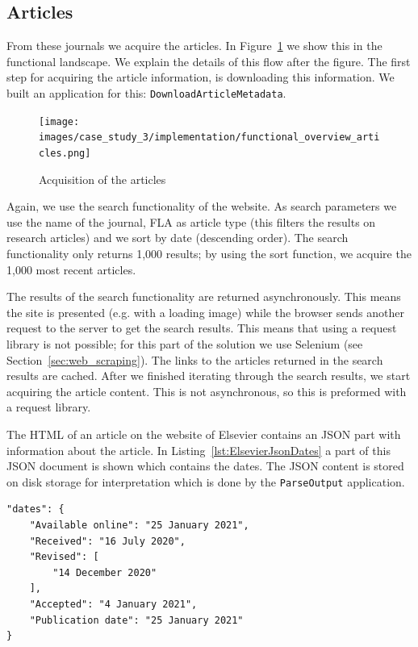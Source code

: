 \documentclass{ou-report}
\begin{document}
\subsection{Articles}
From these journals we acquire the articles. In
Figure~\ref{fig:functional_overview_elsevier_articles} we show this in the functional
landscape. We explain the details of this flow after the figure.
The first step for acquiring the article information, is downloading this 
information. We built an application for this: \verb|DownloadArticleMetadata|. 
\begin{figure}[ht]
\centering
\texttt{[image: images/case\_study\_3/implementation/functional\_overview\_articles.png]}
\caption{Acquisition of the articles}
\label{fig:functional_overview_elsevier_articles}
\end{figure}

Again, we use the search functionality of the website. As search
parameters we use the name of the journal, FLA as article type (this
filters the results on research articles) and we sort by date (descending order).
The search functionality only returns 1,000 results; by using the sort function,
we acquire the 1,000 most recent articles.

The results of the search functionality are returned asynchronously. This means
the site is presented (e.g. with a loading image) while the browser sends another
request to the server to get the search results. This means that using a request
library is not possible; for this part of the solution we use Selenium
(see Section~\ref{sec:web_scraping}). The links to the articles returned in the search
results are cached. After we finished
iterating through the search results, we start acquiring the article content. This
is not asynchronous, so this is preformed with a request library.

The HTML of an article on the website of Elsevier contains an JSON part with
information about the article. In Listing~\ref{lst:ElsevierJsonDates} a part
of this JSON document is shown which contains the dates. The JSON content is
stored on disk storage for interpretation which is done by the \verb|ParseOutput|
application.

\newpage
\begin{lstlisting}[caption={Dates in the JSON document},label={lst:ElsevierJsonDates}]
"dates": {
    "Available online": "25 January 2021",
    "Received": "16 July 2020",
    "Revised": [
        "14 December 2020"
    ],
    "Accepted": "4 January 2021",
    "Publication date": "25 January 2021"
}
\end{lstlisting}
\end{document}
